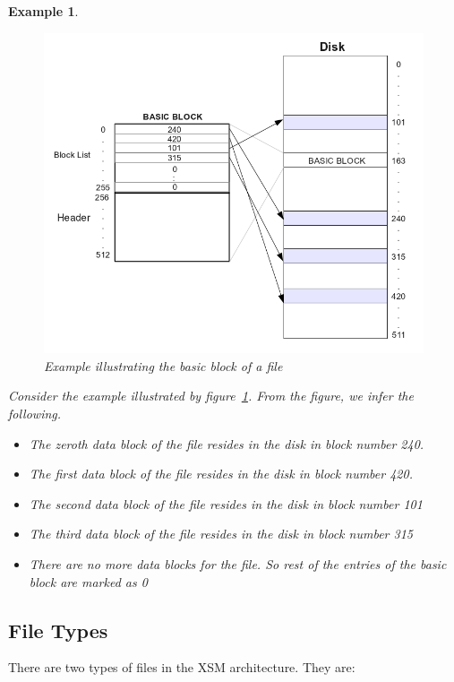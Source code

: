 \documentclass[11pt]{article}
\newtheorem{example}{Example}[section]
\begin{document}
\begin{example}
	\begin{figure}[h!]
	\centering
	\includegraphics[scale=0.50]{pics/basic_block_example}
	\caption{Example illustrating the basic block of a file}
	\label{basic block example}
	\end{figure}

	Consider the example illustrated by figure~\ref{basic block example}.
	From the figure, we infer the following. 
	\begin{itemize}
		\item  The zeroth data block of the file resides in the disk in block number 240. 
		\item  The first data block of the file resides in the disk in block number 420.
		\item  The second data block of the file resides in the disk in block number 101 
		\item  The third data block of the file resides in the disk in block number 315
		\item  There are no more data blocks for the file. So rest of the entries of the basic block are marked as 0
	\end{itemize}
\end{example}

\subsection{File Types} 
There are two types of files in the XSM architecture. They are:
\end{document}
